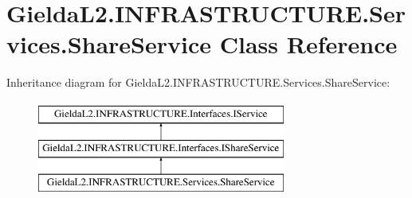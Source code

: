 \hypertarget{class_gielda_l2_1_1_i_n_f_r_a_s_t_r_u_c_t_u_r_e_1_1_services_1_1_share_service}{}\section{Gielda\+L2.\+I\+N\+F\+R\+A\+S\+T\+R\+U\+C\+T\+U\+R\+E.\+Services.\+Share\+Service Class Reference}
\label{class_gielda_l2_1_1_i_n_f_r_a_s_t_r_u_c_t_u_r_e_1_1_services_1_1_share_service}
Inheritance diagram for Gielda\+L2.\+I\+N\+F\+R\+A\+S\+T\+R\+U\+C\+T\+U\+R\+E.\+Services.\+Share\+Service\+:\begin{figure}[H]
\begin{center}
\leavevmode
\includegraphics[height=3.000000cm]{class_gielda_l2_1_1_i_n_f_r_a_s_t_r_u_c_t_u_r_e_1_1_services_1_1_share_service}
\end{center}
\end{figure}
